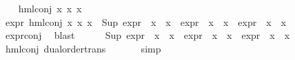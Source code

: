 \begin{isabellebody}
\isanewline
\ \ \isamarkupfalse%
\ {\isacharparenleft}{\kern0pt}hml{\isacharunderscore}{\kern0pt}conj\ x{}\ x{}\ x{}{\isacharparenright}{\kern0pt}\isanewline
\ \ \isamarkupfalse%
\ {\isachardoublequoteopen}expr{\isacharunderscore}{\kern0pt}{}\ {\isacharparenleft}{\kern0pt}hml{\isacharunderscore}{\kern0pt}conj\ x{}\ x{}\ x{}{\isacharparenright}{\kern0pt}\ {\isacharequal}{\kern0pt}\ {\isacharparenleft}{\kern0pt}Sup\ {\isacharparenleft}{\kern0pt}{\isacharparenleft}{\kern0pt}expr{\isacharunderscore}{\kern0pt}{}\ {\isasymcirc}\ x{}{\isacharparenright}{\kern0pt}\ {\isacharbackquote}{\kern0pt}\ x{}\ {\isasymunion}\ {\isacharparenleft}{\kern0pt}expr{\isacharunderscore}{\kern0pt}{}\ {\isasymcirc}\ x{}{\isacharparenright}{\kern0pt}\ {\isacharbackquote}{\kern0pt}\ x{}\ {\isasymunion}\ {\isacharparenleft}{\kern0pt}expr{\isacharunderscore}{\kern0pt}{}\ {\isasymcirc}\ x{}{\isacharparenright}{\kern0pt}\ {\isacharbackquote}{\kern0pt}\ x{}{\isacharparenright}{\kern0pt}{\isacharparenright}{\kern0pt}{\isachardoublequoteclose}\isanewline
\ \ \ \ \isamarkupfalse%
\ expr{\isacharunderscore}{\kern0pt}{}{\isacharunderscore}{\kern0pt}conj\ \isamarkupfalse%
\ blast\isanewline
\ \ \isamarkupfalse%
\ {\isachardoublequoteopen}{}\ {\isasymle}\ {\isacharparenleft}{\kern0pt}Sup\ {\isacharparenleft}{\kern0pt}{\isacharparenleft}{\kern0pt}expr{\isacharunderscore}{\kern0pt}{}\ {\isasymcirc}\ x{}{\isacharparenright}{\kern0pt}\ {\isacharbackquote}{\kern0pt}\ x{}\ {\isasymunion}\ {\isacharparenleft}{\kern0pt}expr{\isacharunderscore}{\kern0pt}{}\ {\isasymcirc}\ x{}{\isacharparenright}{\kern0pt}\ {\isacharbackquote}{\kern0pt}\ x{}\ {\isasymunion}\ {\isacharparenleft}{\kern0pt}expr{\isacharunderscore}{\kern0pt}{}\ {\isasymcirc}\ x{}{\isacharparenright}{\kern0pt}\ {\isacharbackquote}{\kern0pt}\ x{}{\isacharparenright}{\kern0pt}{\isacharparenright}{\kern0pt}{\isachardoublequoteclose}\isanewline
\ \ \ \ \isamarkupfalse%
\ hml{\isacharunderscore}{\kern0pt}conj{\isacharparenleft}{\kern0pt}{}{\isacharparenright}{\kern0pt}\ dual{\isacharunderscore}{\kern0pt}order{\isachardot}{\kern0pt}trans\ \isanewline
\ \ \ \ \isamarkupfalse%
\ simp\isanewline
\ \ \isamarkupfalse%

\end{isabellebody}
